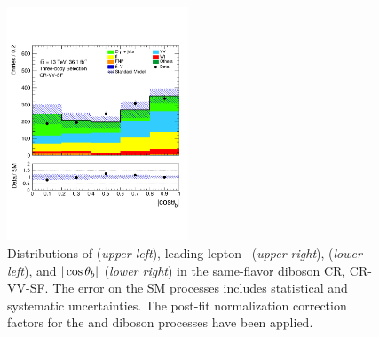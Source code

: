 \begin{figure}[!htb]
\begin{center}
        \includegraphics[width=0.48\textwidth]{figures/search_stop2l/bkg_est/crvsf/crvSF_cosThetaB}
        \caption{
            Distributions of \mdr (\textit{upper left}), leading lepton \pT~(\textit{upper right}),
            \dpb (\textit{lower left}), and $|\cos\theta_b|$ (\textit{lower right}) in the same-flavor diboson CR,
            CR-VV-SF.
            The error on the SM processes includes statistical and systematic uncertainties.
            The post-fit normalization correction factors for the \ttbar and diboson processes
            have been applied.
        }
        \label{fig:crvvSF_0}
    \end{center}
\end{figure}
